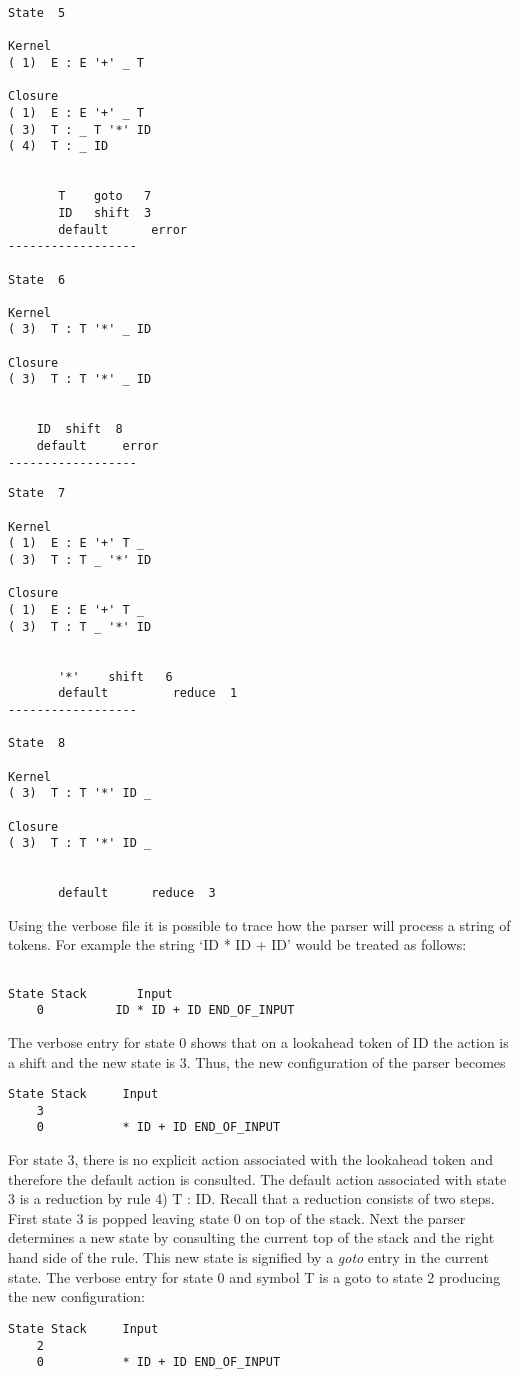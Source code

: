 \newpage
\begin{verbatim}
State  5

Kernel
( 1)  E	: E '+' _ T

Closure
( 1)  E	: E '+' _ T
( 3)  T	: _ T '*' ID
( 4)  T	: _ ID


       T    goto   7
       ID   shift  3
       default      error
------------------

State  6

Kernel
( 3)  T	: T '*' _ ID

Closure
( 3)  T	: T '*' _ ID


 	ID  shift  8
 	default     error
------------------
\end{verbatim}
\newpage
\begin{verbatim}
State  7

Kernel
( 1)  E	: E '+' T _
( 3)  T	: T _ '*' ID

Closure
( 1)  E	: E '+' T _
( 3)  T	: T _ '*' ID


       '*'    shift   6
       default         reduce  1
------------------

State  8

Kernel
( 3)  T	: T '*' ID _

Closure
( 3)  T	: T '*' ID _


       default      reduce  3

\end{verbatim}

Using the verbose file it is possible to trace how the parser will
process a string of tokens.  For example the string `ID * ID + ID' would
be treated as follows:
\begin{verbatim}

State Stack       Input
    0          ID * ID + ID END_OF_INPUT
\end{verbatim}
The verbose entry for state 0 shows that on a lookahead token of
ID the action is a shift and the new state is 3.  Thus, the new
configuration of the parser becomes

\begin{verbatim}
State Stack     Input
    3
    0           * ID + ID END_OF_INPUT

\end{verbatim}

For state 3, there is no explicit action associated with the lookahead
token and therefore the default action is consulted.  The default
action associated
with state 3 is a reduction by rule 4) T : ID.  Recall that a reduction
consists of two steps.  First state 3 is popped leaving state 0
on top of the stack.  Next the parser determines a new state
by consulting the current top of
the stack and the right hand side of the rule.  This new state is
signified by a
{\it goto}
entry in the current state.  The verbose entry
for state 0 and symbol T is a goto to state 2 producing the
new configuration:
\begin{verbatim}
State Stack     Input
    2
    0           * ID + ID END_OF_INPUT

\end{verbatim}

